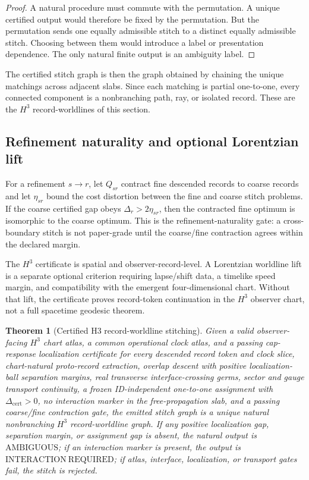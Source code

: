 \documentclass[11pt]{article}
\newtheorem{theorem}{Theorem}[section]
\begin{document}
\begin{proof}
A natural procedure must commute with the permutation. A unique certified output would therefore
be fixed by the permutation. But the permutation sends one equally admissible stitch to a distinct
equally admissible stitch. Choosing between them would introduce a label or presentation
dependence. The only natural finite output is an ambiguity label.
\end{proof}

The certified stitch graph is then the graph obtained by chaining the unique matchings across
adjacent slabs. Since each matching is partial one-to-one, every connected component is a
nonbranching path, ray, or isolated record. These are the \(H^3\) record-worldlines of this
section.

\subsection{Refinement naturality and optional Lorentzian lift}

For a refinement \(s\to r\), let \(Q_{sr}\) contract fine descended records to coarse records and
let \(\eta_{sr}\) bound the cost distortion between the fine and coarse stitch problems. If the
coarse certified gap obeys \(\Delta_r>2\eta_{sr}\), then the contracted fine optimum is
isomorphic to the coarse optimum. This is the refinement-naturality gate: a cross-boundary stitch
is not paper-grade until the coarse/fine contraction agrees within the declared margin.

The \(H^3\) certificate is spatial and observer-record-level. A Lorentzian worldline lift is a
separate optional criterion requiring lapse/shift data, a timelike speed margin, and compatibility
with the emergent four-dimensional chart. Without that lift, the certificate proves
record-token continuation in the \(H^3\) observer chart, not a full spacetime geodesic theorem.

\begin{theorem}[Certified H3 record-worldline stitching]\label{thm:h3-record-worldline-stitching}
Given a valid observer-facing \(H^3\) chart atlas, a common operational clock atlas, and a passing
cap-response localization certificate for every descended record token and clock slice,
chart-natural proto-record extraction, overlap descent with positive localization-ball separation
margins, real transverse interface-crossing germs, sector and gauge transport continuity, a frozen
ID-independent one-to-one assignment with \(\Delta_{\mathrm{cert}}>0\), no interaction marker in
the free-propagation slab, and a passing coarse/fine contraction gate, the emitted stitch graph is
a unique natural nonbranching \(H^3\) record-worldline graph. If any positive localization gap,
separation margin, or assignment gap is absent, the natural output is \(\mathrm{AMBIGUOUS}\); if an
interaction marker is present, the output is \(\mathrm{INTERACTION\ REQUIRED}\); if atlas,
interface, localization, or transport gates fail, the stitch is rejected.
\end{theorem}
\end{document}
